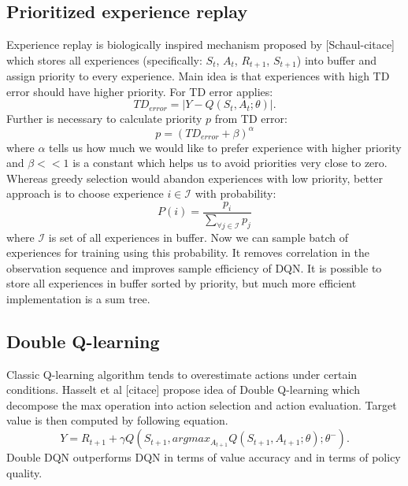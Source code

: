 \subsection{Prioritized experience replay}
Experience replay is biologically inspired mechanism proposed by [Schaul-citace] which stores all experiences (specifically: $S_t$, $A_t$, $R_{t+1}$, $S_{t+1}$) into buffer and assign priority to every experience. Main idea is that experiences with high TD error should have higher priority. For TD error applies:
\begin{equation}
TD_{error} = |Y - Q(S_t, A_t;\theta)|.
\end{equation} 
Further is necessary to calculate priority $p$ from TD error:
\begin{equation}
p = (TD_{error} + \beta)^\alpha
\end{equation}
where $\alpha$ tells us how much we would like to prefer experience with higher priority and $\beta << 1$ is a constant which helps us to avoid priorities very close to zero. Whereas greedy selection would abandon experiences with low priority, better approach is to choose experience $i \in \mathcal{I}$ with probability:
\begin{equation}
P(i) = \frac{p_i}{\sum_{\forall j \in \mathcal{I}} p_j}
\end{equation}
where $\mathcal{I}$ is set of all experiences in buffer. Now we can sample batch of experiences for training using this probability. It removes correlation in the observation sequence and improves sample efficiency of DQN. It is possible to store all experiences in buffer sorted by priority, but much more efficient implementation is a sum tree.

\subsection{Double Q-learning}
Classic Q-learning algorithm tends to overestimate actions under certain conditions. Hasselt et al [citace] propose idea of Double Q-learning which decompose the max operation into action selection and action evaluation. Target value is then computed by following equation.
\begin{equation}
Y = R_{t+1} + \gamma Q(S_{t+1}, argmax_{A_{t+1}}Q(S_{t+1}, A_{t+1};\theta);\theta^-).
\end{equation}
Double DQN outperforms DQN in terms of value accuracy and in terms of policy quality.